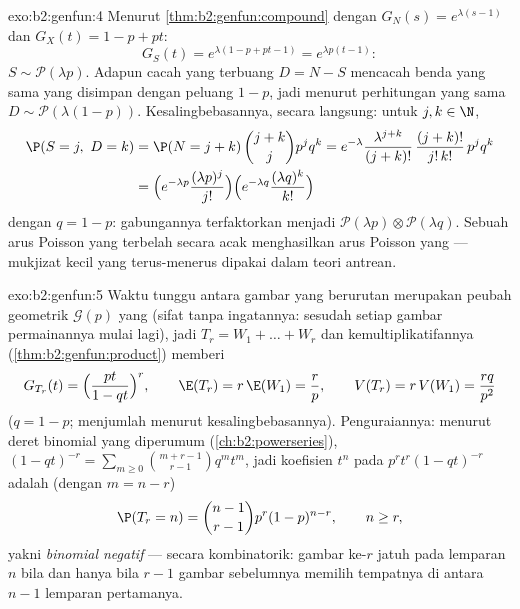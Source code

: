 \begin{solution}{exo:b2:genfun:4}
Menurut \cref{thm:b2:genfun:compound} dengan $G_N(s) = e^{\lambda(s-1)}$
dan $G_X(t) = 1 - p + pt$:
\[
G_S(t) = e^{\lambda(1 - p + pt - 1)} = e^{\lambda p(t - 1)} :
\]
$S \sim \mathcal{P}(\lambda p)$. Adapun cacah yang terbuang $D = N - S$
mencacah benda yang sama yang disimpan dengan peluang $1 - p$, jadi menurut
perhitungan yang sama $D \sim \mathcal{P}(\lambda(1 - p))$.
Kesalingbebasannya, secara langsung: untuk $j, k \in \N$,
\begin{align*}
\P(S = j,\ D = k)
&= \P(N = j + k)\,\binom{j+k}{j}p^jq^k
= e^{-\lambda}\frac{\lambda^{j+k}}{(j+k)!}\,
\frac{(j+k)!}{j!\,k!}\,p^jq^k\\
&= \Bigl(e^{-\lambda p}\frac{(\lambda p)^j}{j!}\Bigr)
\Bigl(e^{-\lambda q}\frac{(\lambda q)^k}{k!}\Bigr)
\end{align*}
dengan $q = 1 - p$:  gabungannya terfaktorkan menjadi
$\mathcal{P}(\lambda p) \otimes \mathcal{P}(\lambda q)$. Sebuah arus Poisson
yang terbelah secara acak menghasilkan arus Poisson yang \emph{} ---
mukjizat kecil yang terus-menerus dipakai dalam teori antrean.
\end{solution}

\begin{solution}{exo:b2:genfun:5}
Waktu tunggu antara gambar yang berurutan merupakan peubah geometrik
$\mathcal{G}(p)$ yang  (sifat tanpa ingatannya: sesudah setiap
gambar permainannya mulai lagi), jadi $T_r = W_1 + \dots + W_r$ dan
kemultiplikatifannya (\cref{thm:b2:genfun:product}) memberi
\[
G_{T_r}(t) = \Bigl(\frac{pt}{1 - qt}\Bigr)^{r},
\qquad
\E(T_r) = r\,\E(W_1) = \frac rp,
\qquad
V(T_r) = r\,V(W_1) = \frac{rq}{p^2}
\]
($q = 1 - p$;  menjumlah menurut kesalingbebasannya). Penguraiannya: menurut
deret binomial yang diperumum
(\cref{ch:b2:powerseries}), $(1 - qt)^{-r} = \sum_{m\geq0}
\binom{m + r - 1}{r - 1}q^mt^m$, jadi koefisien $t^n$ pada
$p^rt^r(1 - qt)^{-r}$ adalah (dengan $m = n - r$)
\[
\P(T_r = n) = \binom{n-1}{r-1}p^r(1-p)^{n-r},
\qquad n \geq r ,
\]
yakni  \emph{binomial negatif} --- secara kombinatorik: gambar ke-$r$
jatuh pada lemparan $n$ bila dan hanya bila $r - 1$ gambar sebelumnya memilih
tempatnya di antara $n - 1$ lemparan pertamanya.
\end{solution}

